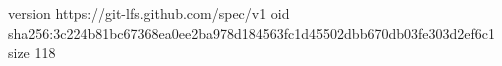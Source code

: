 version https://git-lfs.github.com/spec/v1
oid sha256:3c224b81bc67368ea0ee2ba978d184563fc1d45502dbb670db03fe303d2ef6c1
size 118
